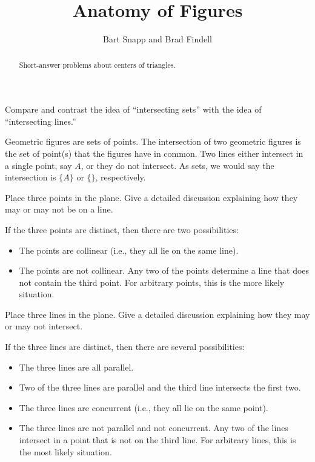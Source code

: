 \documentclass[nooutcomes]{ximera}
\title{Anatomy of Figures}
\author{Bart Snapp and Brad Findell}
\begin{document}
\begin{abstract}
Short-answer problems about centers of triangles. 
\end{abstract}
\maketitle



\begin{problem}
Compare and contrast the idea of ``intersecting sets'' with the
  idea of ``intersecting lines.''
\begin{freeResponse}
\begin{hint}
Geometric figures are sets of points.  The intersection of two geometric figures is the set of point(s) that the figures have in common.  Two lines either intersect in a single point, say $A$, or they do not intersect.  As sets, we would say the intersection is $\{A\}$ or $\{\}$, respectively. 
\end{hint}
\end{freeResponse}
\end{problem}

\begin{problem}
Place three points in the plane. Give a detailed discussion
  explaining how they may or may not be on a line.
\begin{freeResponse}
\begin{hint}
If the three points are distinct, then there are two possibilities:
\begin{itemize}
\item The points are collinear (i.e., they all lie on the same line). 
\item The points are not collinear.  Any two of the points determine a line that does not contain the third point.  For arbitrary points, this is the more likely situation.
\end{itemize}
\end{hint}
\end{freeResponse}
\end{problem}

\begin{problem}
Place three lines in the plane. Give a detailed discussion explaining
  how they may or may not intersect.
\begin{freeResponse}
\begin{hint}
If the three lines are distinct, then there are several possibilities: 
\begin{itemize}
\item The three lines are all parallel. 
\item Two of the three lines are parallel and the third line intersects the first two. 
\item The three lines are concurrent (i.e., they all lie on the same point).
\item The three lines are not parallel and not concurrent.  Any two of the lines intersect in a point that is not on the third line.  For arbitrary lines, this is the most likely situation. 
\end{itemize}
\end{hint}
\end{freeResponse}
\end{problem}
\end{document}
